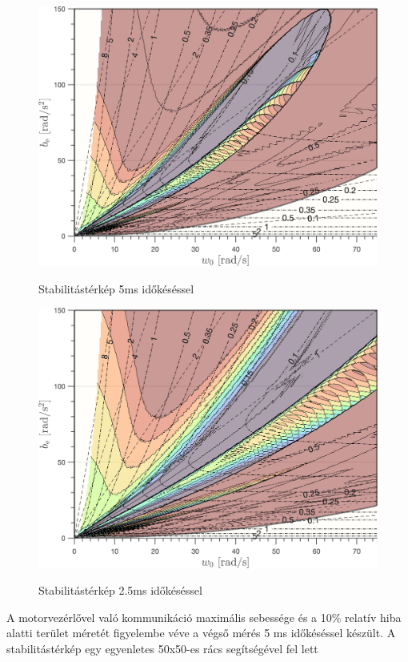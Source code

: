 \begin{figure}[H]
    \begin{center}
    \includegraphics[width=14cm]{images/stab_map_0005.png}
    \caption{Stabilitástérkép 5ms időkéséssel}\label{fig:stab_map_0005}
    \includegraphics[width=14cm]{images/stab_map_00025.png}
    \caption{Stabilitástérkép 2.5ms időkéséssel}\label{fig:stab_map_00025}
    \end{center}
\end{figure}
\pagebreak
A motorvezérlővel való kommunikáció maximális sebessége és a 10\% relatív hiba alatti terület méretét figyelembe véve 
a végső mérés 5 ms időkéséssel készült. A stabilitástérkép egy egyenletes 50x50-es rács segítségével fel lett 
